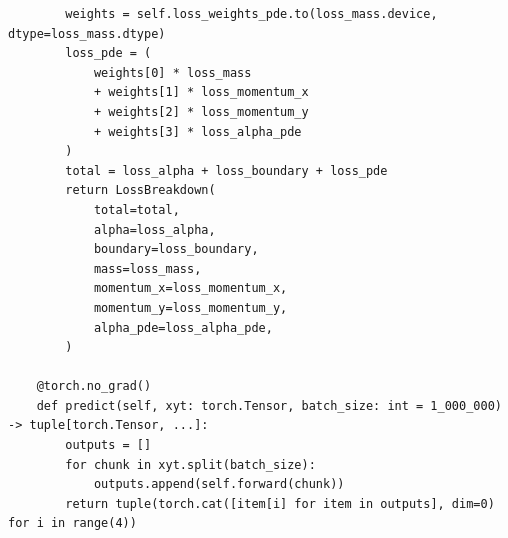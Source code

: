 \begin{lstlisting}
        weights = self.loss_weights_pde.to(loss_mass.device, dtype=loss_mass.dtype)
        loss_pde = (
            weights[0] * loss_mass
            + weights[1] * loss_momentum_x
            + weights[2] * loss_momentum_y
            + weights[3] * loss_alpha_pde
        )
        total = loss_alpha + loss_boundary + loss_pde
        return LossBreakdown(
            total=total,
            alpha=loss_alpha,
            boundary=loss_boundary,
            mass=loss_mass,
            momentum_x=loss_momentum_x,
            momentum_y=loss_momentum_y,
            alpha_pde=loss_alpha_pde,
        )

    @torch.no_grad()
    def predict(self, xyt: torch.Tensor, batch_size: int = 1_000_000) -> tuple[torch.Tensor, ...]:
        outputs = []
        for chunk in xyt.split(batch_size):
            outputs.append(self.forward(chunk))
        return tuple(torch.cat([item[i] for item in outputs], dim=0) for i in range(4))
\end{lstlisting}

